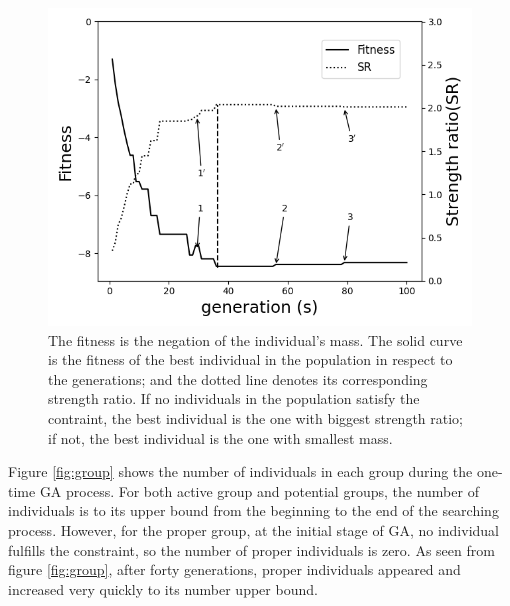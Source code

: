 \begin{figure}[!htb]
	\centering
	\includegraphics[width=\linewidth]{fig/fitness_strength_ratio.png}
	\caption{The fitness is the negation of the individual's mass. The solid
		curve is the fitness of the best individual in the population in respect
		to the generations; and the dotted line denotes its corresponding strength
		ratio. If no individuals in the population satisfy the contraint, the
		best individual is the one with biggest strength ratio; if not, the
		best individual is the one with smallest mass.
}
	\label{fig:sr}
\end{figure}



Figure \ref{fig:group} shows the number of individuals in each group during
the one-time GA process.  For both active group and potential groups, the number of
individuals is to its upper bound from the beginning to the end of the
searching process. However, for the proper group, at the initial stage of GA,
no individual fulfills the constraint, so the number of proper individuals is
zero. As seen from figure \ref{fig:group}, after forty generations, proper
individuals appeared and increased very quickly to its number upper bound.


